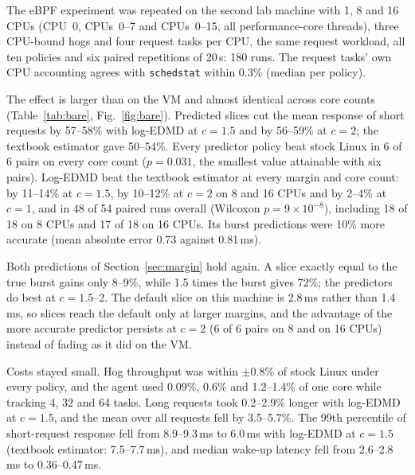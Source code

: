 \documentclass[conference,onecolumn,11pt]{IEEEtran}
\begin{document}
The eBPF experiment was repeated on the second lab machine with 1, 8 and 16 CPUs (CPU~0, CPUs~0--7 and CPUs~0--15, all performance-core threads), three CPU-bound hogs and four request tasks per CPU, the same request workload, all ten policies and six paired repetitions of 20\,s: 180 runs. The request tasks' own CPU accounting agrees with \texttt{schedstat} within 0.3\% (median per policy).

The effect is larger than on the VM and almost identical across core counts (Table~\ref{tab:bare}, Fig.~\ref{fig:bare}). Predicted slices cut the mean response of short requests by 57--58\% with log-EDMD at $c=1.5$ and by 56--59\% at $c=2$; the textbook estimator gave 50--54\%. Every predictor policy beat stock Linux in 6 of 6 pairs on every core count ($p=0.031$, the smallest value attainable with six pairs). Log-EDMD beat the textbook estimator at every margin and core count: by 11--14\% at $c=1.5$, by 10--12\% at $c=2$ on 8 and 16 CPUs and by 2--4\% at $c=1$, and in 48 of 54 paired runs overall (Wilcoxon $p=9\times10^{-8}$), including 18 of 18 on 8 CPUs and 17 of 18 on 16 CPUs. Its burst predictions were 10\% more accurate (mean absolute error 0.73 against 0.81\,ms).

Both predictions of Section~\ref{sec:margin} hold again. A slice exactly equal to the true burst gains only 8--9\%, while 1.5 times the burst gives 72\%; the predictors do best at $c=1.5$--2. The default slice on this machine is 2.8\,ms rather than 1.4\,ms, so slices reach the default only at larger margins, and the advantage of the more accurate predictor persists at $c=2$ (6 of 6 pairs on 8 and on 16 CPUs) instead of fading as it did on the VM.

Costs stayed small. Hog throughput was within $\pm0.8\%$ of stock Linux under every policy, and the agent used 0.09\%, 0.6\% and 1.2--1.4\% of one core while tracking 4, 32 and 64 tasks. Long requests took 0.2--2.9\% longer with log-EDMD at $c=1.5$, and the mean over all requests fell by 3.5--5.7\%. The 99th percentile of short-request response fell from 8.9--9.3\,ms to 6.0\,ms with log-EDMD at $c=1.5$ (textbook estimator: 7.5--7.7\,ms), and median wake-up latency fell from 2.6--2.8\,ms to 0.36--0.47\,ms.
\end{document}

